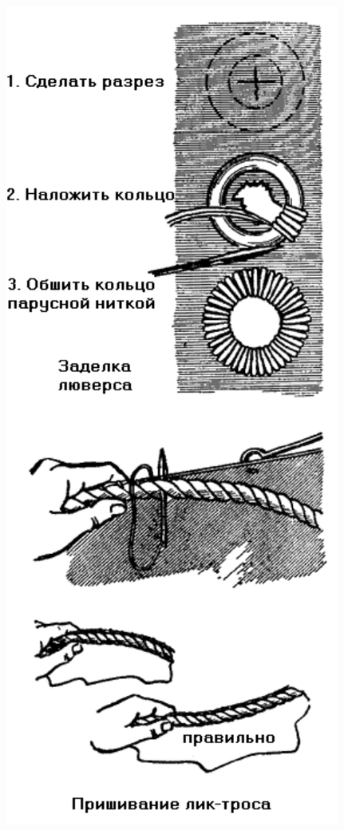 \documentclass[a4paper, 12pt, twoside, final]{scrbook}
\begin{document}
\begin{figure}[htbp]
	\begin{minipage}[b]{0.49\textwidth}
		\centering\includegraphics[scale=1]{72_1_Remont_parusov}
	\end{minipage}

\end{figure}
\end{document}
